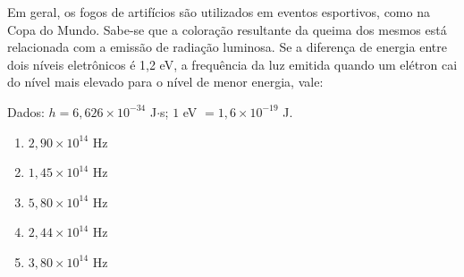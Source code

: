 Em geral, os fogos de artifícios são utilizados em eventos esportivos, como na
Copa do Mundo. Sabe-se que a coloração resultante da queima dos mesmos está
relacionada com a emissão de radiação luminosa. Se a diferença de energia entre
dois níveis eletrônicos é 1,2 eV, a frequência da luz emitida quando um elétron cai
do nível mais elevado para o nível de menor energia, vale:

Dados: $h = 6,626 \times 10^{-34}$ J$\cdot$s; $1$ eV $= 1,6 \times 10^{-19}$ J.

\begin{enumerate}[label = (\alph*), itemjoin={\quad}]
	\item $2,90 \times 10^{14}$ Hz
	\item $1,45 \times 10^{14}$ Hz
	\item $5,80 \times 10^{14}$ Hz
	\item $2,44 \times 10^{14}$ Hz
	\item $3,80 \times 10^{14}$ Hz
\end{enumerate}
